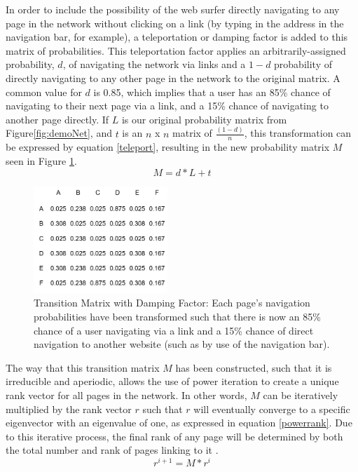 \documentclass[]{report}   %
\begin{document}
\FloatBarrier

In order to include the possibility of the web surfer directly navigating to any page in the network without clicking on a link (by typing in the address in the navigation bar, for example), a teleportation or damping factor is added to this matrix of probabilities. This teleportation factor applies an arbitrarily-assigned probability, $d$, of navigating the network via links and a $1-d$ probability of directly navigating to any other page in the network to the original matrix. A common value for $d$ is 0.85, which implies that a user has an 85\% chance of navigating to their next page via a link, and a 15\% chance of navigating to another page directly. If $L$ is our original probability matrix from Figure\ref{fig:demoNet}, and $t$ is an $n$ x $n$ matrix of $\frac{(1-d)}{n}$, this transformation can be expressed by equation \ref{teleport}, resulting in the new probability matrix $M$ seen in Figure \ref{fig:demoDamp}.
\begin{equation}
\label{teleport}
M=d*L+t
\end{equation}

\begin{figure}[h]
    \centering
    \begin{minipage}{0.9\textwidth}
        \centering
        \includegraphics[width=0.45\textwidth]{Marbut_DemoWDamping.png} %
        \caption{Transition Matrix with Damping Factor: Each page's navigation probabilities have been transformed such that there is now an 85\% chance of a user navigating via a link and a 15\% chance of direct navigation to another website (such as by use of the navigation bar).}
	  \label{fig:demoDamp}
    \end{minipage}
 \end{figure}
\FloatBarrier 

The way that this transition matrix $M$ has been constructed, such that it is irreducible and aperiodic, allows the use of power iteration to create a unique rank vector for all pages in the network. In other words, $M$ can be iteratively multiplied by the rank vector $r$ such that $r$ will eventually converge to a specific eigenvector with an eigenvalue of one, as expressed in equation \ref{powerrank}. Due to this iterative process, the final rank of any page will be determined by both the total number and rank of pages linking to it \cite{haveliwala_2002}.
\begin{equation}
\label{powerrank}
r^{i+1}=M*r^{i}
\end{equation}
\end{document}
